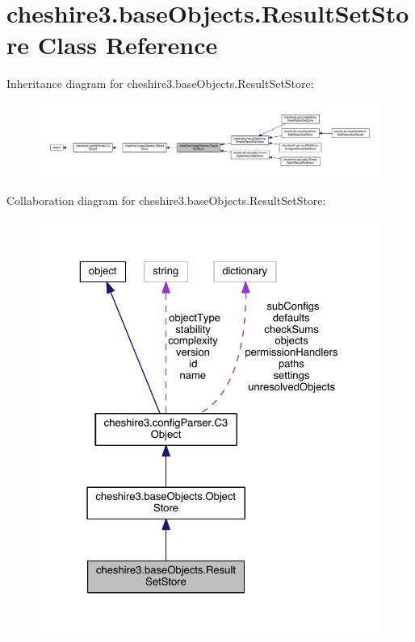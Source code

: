 \hypertarget{classcheshire3_1_1base_objects_1_1_result_set_store}{\section{cheshire3.\-base\-Objects.\-Result\-Set\-Store Class Reference}
\label{classcheshire3_1_1base_objects_1_1_result_set_store}
}


Inheritance diagram for cheshire3.\-base\-Objects.\-Result\-Set\-Store\-:
\nopagebreak
\begin{figure}[H]
\begin{center}
\leavevmode
\includegraphics[width=350pt]{classcheshire3_1_1base_objects_1_1_result_set_store__inherit__graph}
\end{center}
\end{figure}


Collaboration diagram for cheshire3.\-base\-Objects.\-Result\-Set\-Store\-:
\nopagebreak
\begin{figure}[H]
\begin{center}
\leavevmode
\includegraphics[width=325pt]{classcheshire3_1_1base_objects_1_1_result_set_store__coll__graph}
\end{center}
\end{figure}
